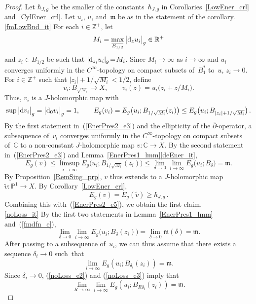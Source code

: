 \documentclass[11pt]{article}
\numberwithin{equation}{section}
\theoremstyle{definition}
\def\BE#1{\begin{equation}\label{#1}}
\def\EE{\end{equation}}
\def\eref#1{(\ref{#1})}
\def\ov#1{\overline{#1}}
\def\wt#1{\widetilde{#1}}
\def\lra{\longrightarrow}
\def\C{\mathbb{C}}
\def\fm{\mathfrak m}
\def\P{\mathbb{P}}
\def\R{\mathbb R}
\def\Z{{\mathbb Z}}
\def\de{\delta}
\def\i{\infty}
\def\dbar{\bar\partial}
\def\hb{\hbar}
\def\nd{\textnormal{d}}
\begin{document}
\begin{proof}
Let $\hb_{J,g}$ be the smaller of the constants~$\hb_{J,g}$ 
in Corollaries~\ref{LowEner_crl} and~\ref{CylEner_crl}.
Let $u_i$, $u$, and~$\fm$ be as in the statement of the corollary.\\

\noindent
\ref{fmLowBnd_it} For each $i\!\in\!\Z^+$, let 
$$M_i=\max_{\ov{B_{1/2}}}\big|\nd_zu_i\big|_g\in\R^+$$
and $z_i\!\in\!\ov{B_{1/2}}$ be such that $|\nd_{z_i}u_i|_g\!=\!M_i$.
Since $M_i\!\lra\!\i$ as $i\!\lra\!\i$ and
$u_i$ converges uniformly in the $C^{\i}$-topology on compact subsets of~$B_1^*$
to~$u$, $z_i\!\lra\!0$.
For $i\!\in\!\Z^+$ such that $|z_i|\!+\!1/\sqrt{M_i}\!<\!1/2$, define
$$v_i\!:B_{\sqrt{M_i}}\lra X, \qquad v_i(z)=u_i\big(z_i\!+\!z/M_i\big).$$
Thus, $v_i$ is a $J$-holomorphic map with 
\BE{EnerPres2_e3}\sup\big|\nd v_i\big|_g=\big|\nd_0v_i\big|_g=1, \qquad 
E_g(v_i)=E_g\big(u_i;B_{1/\sqrt{M_i}}(z_i)\big)\le 
E_g\big(u_i;B_{|z_i|+1/\sqrt{M_i}}\big)\,.\EE
By the first statement in~\eref{EnerPres2_e3} and the ellipticity of the $\dbar$-operator, 
a subsequence of~$v_i$ converges  uniformly in the $C^{\i}$-topology on compact subsets of~$\C$
to a non-constant $J$-holomorphic map \hbox{$v\!:\C\!\lra\!X$}.
By the second statement in~\eref{EnerPres2_e3} and Lemma~\ref{EnerPres1_lmm}\ref{deEner_it},
\BE{EnerPres2_e5} E_g(v)
\le \limsup_{i\lra\i}E_g\big(u_i;B_{1/\sqrt{M_i}}(z_i)\big)
\le \lim_{\de\lra0}\lim_{i\lra\i}E_g\big(u_i;B_{\de}\big)=\fm.\EE
By Proposition~\ref{RemSing_prp}, $v$ thus extends to a $J$-holomorphic map 
$\wt{v}\!:\P^1\!\lra\!X$.
By Corollary~\ref{LowEner_crl}, 
$$E_g(v)=E_g(\wt{v})\ge \hb_{J,g}\,.$$
Combining this with~\eref{EnerPres2_e5}, we obtain the first claim.\\

\noindent
\ref{noLoss_it} By the first two statements in Lemma~\ref{EnerPres1_lmm}
and~\eref{fmdfn_e},
\BE{noLoss_e2} \lim_{\de\lra0}\lim_{i\lra\i}E_g\big(u_i;B_{\de}(z_i)\big)=
\lim_{\de\lra0}\fm(\de)=\fm.\EE
After passing to a subsequence of~$u_i$, we can thus assume that there exists
a sequence $\de_i\!\lra\!0$ such~that
\BE{noLoss_e3} \lim_{i\lra\i}E_g(u_i;B_{\de_i}(z_i))=\fm.\EE
Since $\de_i\!\lra\!0$, \eref{noLoss_e2} and \eref{noLoss_e3} imply that 
\BE{noLoss_e5}\lim_{R\lra\i}\lim_{i\lra\i}E_g(u_i;B_{R\de_i}(z_i))=\fm.\EE

\vspace{.1in}


\end{proof}
\end{document}
